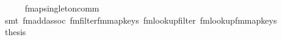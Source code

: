 \begin{isabellebody}
\ \ \ \ \isamarkupfalse%
\ fmap{\isacharunderscore}{\kern0pt}singleton{\isacharunderscore}{\kern0pt}comm\isanewline
\ \ \ \ \isamarkupfalse%
\ {\isacharparenleft}{\kern0pt}smt\ fmadd{\isacharunderscore}{\kern0pt}assoc\ fmfilter{\isacharunderscore}{\kern0pt}fmmap{\isacharunderscore}{\kern0pt}keys\ fmlookup{\isacharunderscore}{\kern0pt}filter\ fmlookup{\isacharunderscore}{\kern0pt}fmmap{\isacharunderscore}{\kern0pt}keys{\isacharparenright}{\kern0pt}\isanewline
\ \ \isamarkupfalse%
\ \isamarkupfalse%
\ {\isacharquery}{\kern0pt}thesis\ \isacommand{{\isachardot}{\kern0pt}}\isamarkupfalse%
\isanewline
{}\isamarkupfalse%
%
\endisatagproof
{\isafoldproof}%
%
\isadelimproof
\isanewline
%
\endisadelimproof
%
\isadelimtheory
\isanewline
%
\endisadelimtheory
%
\isatagtheory
{}\isamarkupfalse%
%
\endisatagtheory
{\isafoldtheory}%
%
\isadelimtheory
%
\endisadelimtheory
%
\end{isabellebody}%
\endinput
